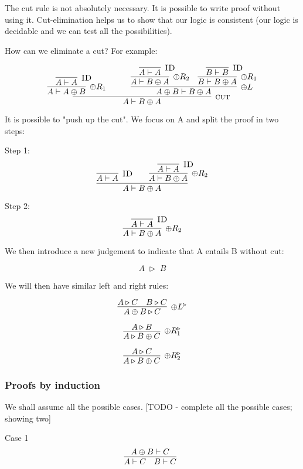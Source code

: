 \documentclass{article}
\begin{document}
The cut rule is not absolutely necessary. It is possible to write proof without using it. Cut-elimination helps us to show that our logic is consistent (our logic is decidable and we can test all the possibilities).

How can we eliminate a cut? For example:




\[
\infer[\textsc{cut}]
{A \vdash B \oplus A }{\infer[\oplus R_1]{A \vdash A \oplus B}{\infer[\textsc{ID}]{A \vdash A}{}} \hspace{3em} \infer[\oplus L]{A \oplus B \vdash B \oplus A}{\infer[\oplus R_2]{A \vdash B \oplus A}{\infer[\textsc{ID}]{A \vdash A}{}} \hspace{1em} \infer[\oplus R_1]{B \vdash B \oplus A}{\infer[\textsc{ID}]{B \vdash B}{}}  }}
\]


It is possible to "push up the cut". We focus on A and split the proof in two steps:

Step 1: 
\[
\infer[]{A \vdash B \oplus A}{\infer[\textsc{ID}]{A \vdash A}{} \hspace{2em} \infer[\oplus R_2]{A \vdash B \oplus A}{\infer[\textsc{ID}]{A \vdash A}{}}}
\]

Step 2: 
\[
\infer[\oplus R_2]{A \vdash B \oplus A}{\infer[\textsc{ID}]{A \vdash A}{}}
\]

We then introduce a new judgement to indicate that A entails B without cut:

\[
\; A\; \triangleright\; B\; 
\]

We will then have similar left and right rules:

\[
\infer[\oplus L^{\triangleright}]{A \oplus B \triangleright C}{A \triangleright C \hspace{1em} B \triangleright C}
\]

\[
\infer[\oplus R_{1}^{\triangleright}]{A \triangleright B \oplus C}{A \triangleright B}
\]

\[
\infer[\oplus R_{2}^{\triangleright}]{A \triangleright B \oplus C}{A \triangleright C}
\]

\subsubsection{Proofs by induction}

We shall assume all the possible cases. 
[TODO - complete all the possible cases; showing two]

Case 1
\[
\infer[]{A \vdash C \hspace{1em} B \vdash C}{A \oplus B \vdash C} 
\]
\end{document}
